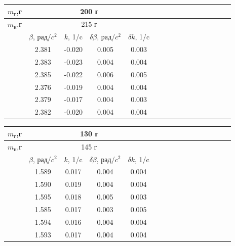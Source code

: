 \documentclass[14pt]{article}
\begin{document}
\begin{center}
\begin{tabular}{|c|c|c|c|c|c|c|c|c|c|c|c|c|c|c|c|}
\hline
$m_\text{г}$,г	&\multicolumn{4}{|c|}{200 г}			\\
\hline
$m_\text{н}$,г	&\multicolumn{4}{|c|}{215 г}		\\
\hline
				&	$\beta$, рад/$c^2$		&	$k$, 1/c		&	$\delta\beta$, рад/$c^2$		&	$\delta k$, 1/c			\\
\hline
				&	2.381					&	-0.020			&	0.005							&	0.003					\\
\hline
				&	2.383					&	-0.023			&	0.004							&	0.004					\\
\hline
				&	2.385					&	-0.022			&	0.006							&	0.005					\\
\hline
				&	2.376					&	-0.019			&	0.004							&	0.004					\\
\hline
				&	2.379					&	-0.017			&	0.004							&	0.003					\\
\hline
				&	2.382					&	-0.020			&	0.004							&	0.004					\\
\hline
\end{tabular}
\end{center}

\begin{center}
\begin{tabular}{|c|c|c|c|c|c|c|c|c|c|c|c|c|c|c|c|}
\hline
$m_\text{г}$,г	&\multicolumn{4}{|c|}{130 г}			\\
\hline
$m_\text{н}$,г	&\multicolumn{4}{|c|}{145 г}		\\
\hline
				&	$\beta$, рад/$c^2$		&	$k$, 1/c		&	$\delta\beta$, рад/$c^2$		&	$\delta k$, 1/c			\\
\hline
				&	1.589					&	0.017			&	0.004							&	0.004					\\
\hline
				&	1.590					&	0.019			&	0.004							&	0.004					\\
\hline
				&	1.595					&	0.018			&	0.005							&	0.003					\\
\hline
				&	1.585					&	0.017			&	0.003							&	0.005					\\
\hline
				&	1.594					&	0.016			&	0.004							&	0.004					\\
\hline
				&	1.593					&	0.017			&	0.004							&	0.004					\\
\hline
\end{tabular}
\end{center}
\end{document}
